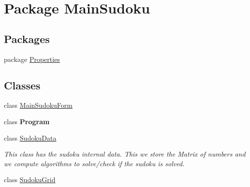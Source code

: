 \hypertarget{namespace_main_sudoku}{\section{Package Main\-Sudoku}
\label{namespace_main_sudoku}
}
\subsection*{Packages}
\begin{DoxyCompactItemize}
\item 
package \hyperlink{namespace_main_sudoku_1_1_properties}{Properties}
\end{DoxyCompactItemize}
\subsection*{Classes}
\begin{DoxyCompactItemize}
\item 
class \hyperlink{class_main_sudoku_1_1_main_sudoku_form}{Main\-Sudoku\-Form}
\item 
class {\bfseries Program}
\item 
class \hyperlink{class_main_sudoku_1_1_sudoku_data}{Sudoku\-Data}
\begin{DoxyCompactList}\small\item\em This class has the sudoku internal data. This we store the Matrix of numbers and we compute algorithms to solve/check if the sudoku is solved. \end{DoxyCompactList}\item 
class \hyperlink{class_main_sudoku_1_1_sudoku_grid}{Sudoku\-Grid}
\end{DoxyCompactItemize}
